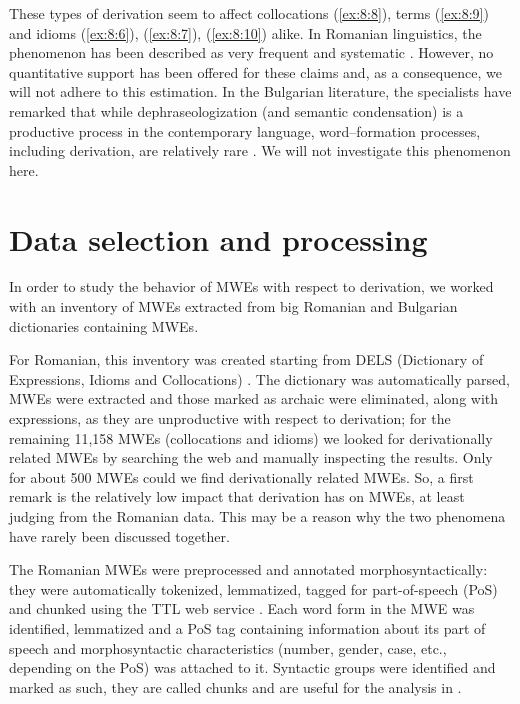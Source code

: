 \documentclass[output=paper]{langsci/langscibook}
\begin{document}
These types of derivation seem to affect  collocations (\ref{ex:8:8}),  terms (\ref{ex:8:9}) and 
idioms (\ref{ex:8:6}), (\ref{ex:8:7}), (\ref{ex:8:10})  alike. In Romanian linguistics, the phenomenon has
been described as very frequent and systematic \citep{groza2011}. However,
no quantitative support has been offered for these claims and, as a
consequence, we will not adhere to this estimation. In the Bulgarian
literature, the specialists have remarked that while dephraseologization
(and semantic condensation) is a productive process in the contemporary
language, word–formation processes, including derivation, are
relatively rare \citep{blagoeva2011}. We will not investigate this
phenomenon here.


\section{Data selection and processing}
\label{dataselection}
In order to study the behavior of MWEs with respect to derivation, we
worked with an inventory of MWEs extracted from big Romanian and
Bulgarian dictionaries containing MWEs.



For Romanian, this inventory was created starting from DELS (Dictionary
of Expressions, Idioms and Collocations) \citep{muaruanduc2010}. The
dictionary was automatically parsed, MWEs were extracted and those
marked as archaic were eliminated, along with expressions, as they are
unproductive with respect to derivation; for the remaining 11,158 MWEs
(collocations and idioms) we looked for derivationally related MWEs by
searching the web and manually inspecting the results. Only for
about 500 MWEs could we find derivationally related MWEs. So, a first
remark is the relatively low impact that derivation has on MWEs, at
least judging from the Romanian data. This may be a reason why the two
phenomena have rarely been discussed together.



The Romanian MWEs were preprocessed and annotated morphosyntactically:
they were automatically tokenized, lemmatized, tagged for
part-of-speech (PoS) and chunked using the TTL web service \citep{ion2007}.
Each word form in the MWE was identified, lemmatized and a PoS tag
containing information about its part of speech and morphosyntactic
characteristics (number, gender, case, etc., depending on the PoS) was
attached to it. Syntactic groups were identified and marked as such, they
 are called chunks and are useful for the analysis in  .
\end{document}
